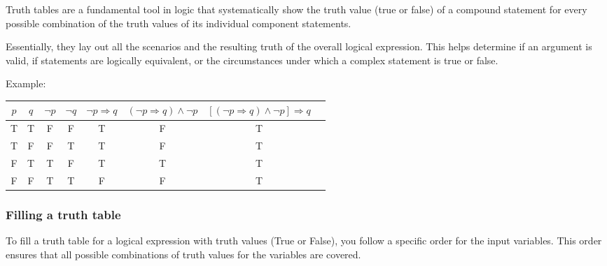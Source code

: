 Truth tables are a fundamental tool in logic that systematically show the truth value
(true or false) of a compound statement for every possible combination of the truth values of its individual component statements.

Essentially, they lay out all the scenarios and the resulting truth of the overall logical expression.
This helps determine if an argument is valid, if statements are logically equivalent, or the circumstances
under which a complex statement is true or false.

Example:
\smallskip

\begin{center}
	\begin{tabular}{|c|c|c|c|c|c|c|c|}
		\hline
		$p$ & $q$ & $\neg p$ & $\neg q$ & $\neg p \Rightarrow q$ & $(\neg p \Rightarrow q) \land \neg p$ & $\left[(\neg p \Rightarrow q) \land \neg p\right] \Rightarrow q$ \\
		\hline
		T   & T   & F        & F        & T                      & F                                     & T                                                                \\
		T   & F   & F        & T        & T                      & F                                     & T                                                                \\
		F   & T   & T        & F        & T                      & T                                     & T                                                                \\
		F   & F   & T        & T        & F                      & F                                     & T                                                                \\
		\hline
	\end{tabular}
\end{center}

\subsubsection{Filling a truth table}
To fill a truth table for a logical expression with truth values (True or False), you follow a specific order for the input variables. This order ensures that all possible combinations of truth values for the variables are covered.

